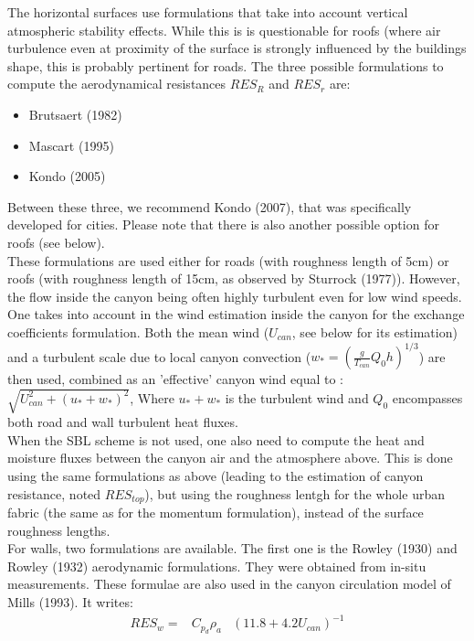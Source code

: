 The horizontal surfaces use formulations that take into account vertical atmospheric stability effects. While this is is questionable for roofs (where air turbulence even at proximity of the surface is strongly influenced by the buildings shape, this is probably pertinent for roads. The three possible formulations to compute the aerodynamical resistances $RES_{R}$ and $RES_{r}$ are: \\
\begin{itemize}
\item Brutsaert (1982) \nocite{Brutsaert1982}
\item Mascart \etal (1995)\nocite{Mascart1995}
\item Kondo \etal  (2005)\nocite{Kondo2005}
\end{itemize}
Between these three, we recommend Kondo \etal (2007), that was specifically developed for cities.
Please note that there is also another possible option for roofs (see below). \\

These formulations are used either for roads (with roughness length of 5cm) or roofs (with roughness length of 15cm, as observed by Sturrock \etal (1977)\nocite{Sturrock1977}). However, the flow inside the canyon being often highly turbulent even for low wind speeds. One takes into account in the wind estimation inside the canyon for the exchange coefficients formulation. Both the mean wind ($U_{can}$, see below for its estimation) and a turbulent scale due to local canyon convection ($w_*=\left ( \frac{g}{T_{can}}Q_{0}h \right )^{1/3}$) are then used, combined as an 'effective' canyon wind equal to : $\sqrt{U_{can}^2+(u_{*}+w_{*})^2}$, Where $u_{*}+w_{*}$ is the turbulent wind and $Q_{0}$ encompasses both road and wall turbulent heat fluxes. \\

When the SBL scheme is not used, one also need to compute the heat and moisture fluxes between the canyon air and the atmosphere above. This is done using the same formulations as above (leading to the estimation of canyon resistance, noted $RES_{top}$), but using the roughness lentgh for the whole urban fabric (the same as for the momentum formulation), instead of the surface roughness lengths.\\

For walls, two formulations are available. The first one is  the Rowley \etal (1930)\nocite{Rowley1930} and Rowley \etal (1932)\nocite{Rowley1932} aerodynamic formulations. They were obtained from in-situ measurements. These formulae are also used in the canyon circulation model of Mills (1993). It writes:
\begin{eqnarray}
RES_{w} = & C_{p_d} \rho_a &  \left(11.8 + 4.2 U_{can}\right)^{-1}
\end{eqnarray}

